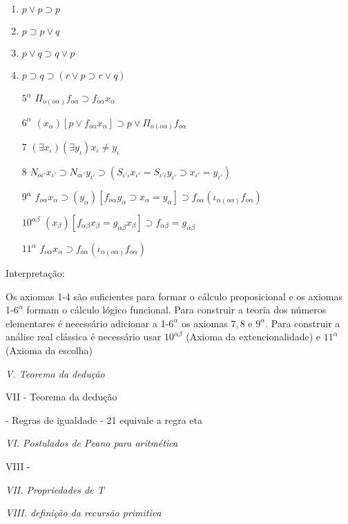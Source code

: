 \documentclass[../main.tex]{subfiles}
\begin{document}
\begin{enumerate}
    \item $p \lor p \supset p$
    \item $p \supset p \lor q$
    \item $p \lor q \supset q \lor p$
    \item $p \supset q \supset (r \lor p \supset r \lor q)$
    \item[$5^{\alpha}$] $\Pi_{o(o\alpha)}f_{o\alpha} \supset f_{o\alpha}x_{\alpha}$
    \item[$6^{\alpha}$] $(x_\alpha)[p \lor f_{o\alpha}x_{\alpha}] \supset p \lor \Pi_{o(o\alpha)}f_{o\alpha}$
    \item[7] $(\exists x_{\iota})(\exists y_{\iota}) x_{\iota} \neq y_{\iota} $
    \item[8] $N_{o \iota'}x_{\iota'} \supset N_{o \iota'}y_{\iota'} \supset (S_{\iota'\iota}x_{\iota'} = S_{\iota'\iota}y_{\iota'} \supset x_{\iota'} = y_{\iota'})$
    \item[$9^{\alpha}$] $f_{o \alpha} x_{\alpha} \supset (y_{\alpha}) [f_{o \alpha}y_{\alpha} \supset x_{\alpha} = y_{\alpha}] \supset f_{o \alpha} (\iota_{\alpha(o \alpha)} f_{o \alpha})$
    \item[$10^{\alpha\beta}$] $(x_{\beta})[f_{\alpha\beta} x_{\beta} = g_{\alpha\beta} x_{\beta}] \supset f_{\alpha\beta} = g_{\alpha\beta}$ 
    \item[$11^{\alpha}$] $f_{o \alpha} x_{\alpha} \supset f_{o \alpha} (\iota_{\alpha(o \alpha)} f_{o \alpha})$
\end{enumerate}

Interpretação:

Os axiomas 1-4 são suficientes para formar o cálculo proposicional e os axiomas 1-$6^{\alpha}$ formam o cálculo lógico funcional. Para construir a teoria dos números elementares é necessário adicionar a 1-$6^{\alpha}$ os axiomas $7, 8$ e $9^{\alpha}$. Para construir a análise real clássica é necessário usar $10^{\alpha\beta}$ (Axioma da extencionalidade) e $11^{\alpha}$ (Axioma da escolha)

\emph{V. Teorema da dedução}

VII - Teorema da dedução

- Regras de igualdade
- 21 equivale a regra eta


\emph{VI. Postulados de Peano para aritmética}

VIII - 

\emph{VII. Propriedades de T}

\emph{VIII. definição da recursão primitiva}
\end{document}
